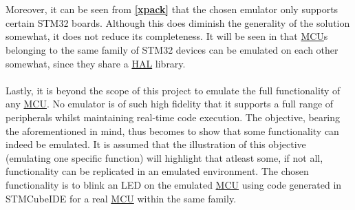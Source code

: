 \\\\
Moreover, it can be seen from \textbf{\ref{xpack} } that the chosen emulator only supports certain STM32 boards. Although this does diminish the generality of the solution somewhat, it does not reduce its completeness. It will be seen in \textbf{} that \hyperref[listAbr]{MCU}s belonging to the same family of STM32 devices can be emulated on each other somewhat, since they share a \hyperref[listAbr]{HAL} library.
\\\\
Lastly, it is beyond the scope of this project to emulate the full functionality of any \hyperref[listAbr]{MCU}. No emulator is of such high fidelity that it supports a full range of peripherals whilst maintaining real-time code execution. The objective, bearing the aforementioned in mind, thus becomes to show that some functionality can indeed be emulated. It is assumed that the illustration of this objective (emulating one specific function) will highlight that atleast some, if not all, functionality can be replicated in an emulated environment. The chosen functionality is to blink an LED on the emulated \hyperref[listAbr]{MCU} using code generated in STMCubeIDE for a real \hyperref[listAbr]{MCU} within the same family. 

